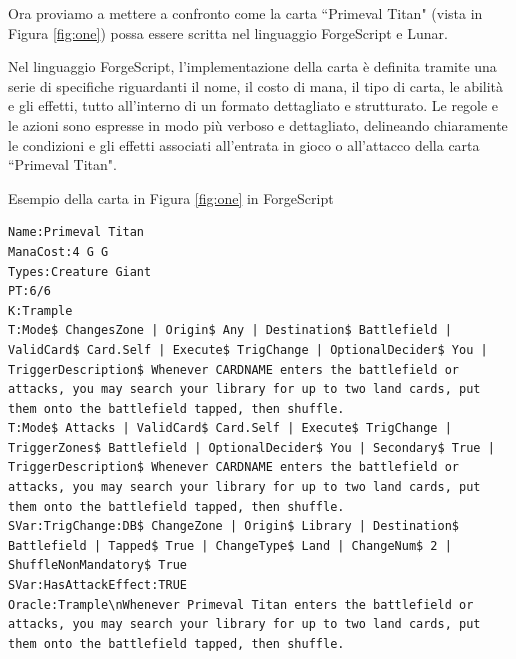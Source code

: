 Ora proviamo a mettere a confronto come la carta ``Primeval Titan" (vista in Figura \ref{fig:one}) possa essere scritta nel linguaggio ForgeScript e Lunar.


Nel linguaggio ForgeScript, l'implementazione della carta è definita tramite una serie di specifiche riguardanti il nome, il costo di mana, il tipo di carta, le abilità e gli effetti, tutto all'interno di un formato dettagliato e strutturato. Le regole e le azioni sono espresse in modo più verboso e dettagliato, delineando chiaramente le condizioni e gli effetti associati all'entrata in gioco o all'attacco della carta ``Primeval Titan".


\begin{algorithm}
	\caption{Esempio della carta in Figura \ref{fig:one} in ForgeScript}
	\label{lst:prime_titan_fs}
	\begin{lstlisting}
Name:Primeval Titan
ManaCost:4 G G
Types:Creature Giant
PT:6/6
K:Trample
T:Mode$ ChangesZone | Origin$ Any | Destination$ Battlefield | ValidCard$ Card.Self | Execute$ TrigChange | OptionalDecider$ You | TriggerDescription$ Whenever CARDNAME enters the battlefield or attacks, you may search your library for up to two land cards, put them onto the battlefield tapped, then shuffle.
T:Mode$ Attacks | ValidCard$ Card.Self | Execute$ TrigChange | TriggerZones$ Battlefield | OptionalDecider$ You | Secondary$ True | TriggerDescription$ Whenever CARDNAME enters the battlefield or attacks, you may search your library for up to two land cards, put them onto the battlefield tapped, then shuffle.
SVar:TrigChange:DB$ ChangeZone | Origin$ Library | Destination$ Battlefield | Tapped$ True | ChangeType$ Land | ChangeNum$ 2 | ShuffleNonMandatory$ True
SVar:HasAttackEffect:TRUE
Oracle:Trample\nWhenever Primeval Titan enters the battlefield or attacks, you may search your library for up to two land cards, put them onto the battlefield tapped, then shuffle. 
	\end{lstlisting}
\end{algorithm}


